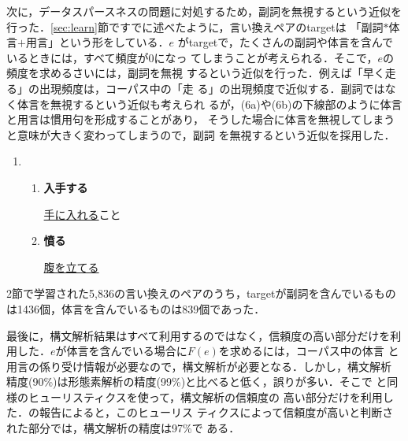 \documentclass{nlp}
\begin{document}
次に，データスパースネスの問題に対処するため，副詞を無視するという近似を
行った．\ref{sec:learn}節ですでに述べたように，言い換えペアのtargetは
「副詞\hspace{-1pt}$*$体言\hspace{-1pt}$+$用言」という形をしている．$e$
がtargetで，たくさんの副詞や体言を含んでいるときには，すべて頻度が0になっ
てしまうことが考えられる．そこで，$e$の頻度を求めるさいには，副詞を無視
するという近似を行った．例えば「早く走る」の出現頻度は，コーパス中の「走
る」の出現頻度で近似する．副詞ではなく体言を無視するという近似も考えられ
るが，(6a)や(6b)の下線部のように体言と用言は慣用句を形成することがあり，
そうした場合に体言を無視してしまうと意味が大きく変わってしまうので，副詞
を無視するという近似を採用した．
\vspace{10pt}
\begin{enumerate}
 \item
      \begin{enumerate}
       \item {\bf 入手する}

	     \underline{手に入れる}こと
	     
       \item {\bf 憤る}
	     
	     \underline{腹を立てる}
      \end{enumerate}
\end{enumerate}
\addtocounter{exnum}{1}
2節で学習された5,836の言い換えのペアのうち，targetが副詞を含んでいるもの
は1436個，体言を含んでいるものは839個であった．

最後に，構文解析結果はすべて利用するのではなく，信頼度の高い部分だけを利
用した．$e$が体言を含んでいる場合に$F(e)$を求めるには，コーパス中の体言
と用言の係り受け情報が必要なので，構文解析が必要となる．しかし，構文解析
精度(90\%)は形態素解析の精度(99\%)と比べると低く，誤りが多い．そこで
\cite{Kawahara01}と同様のヒューリスティクスを使って，構文解析の信頼度の
高い部分だけを利用した．\cite{Kawahara01}の報告によると，このヒューリス
ティクスによって信頼度が高いと判断された部分では，構文解析の精度は97\%で
ある．
\end{document}
